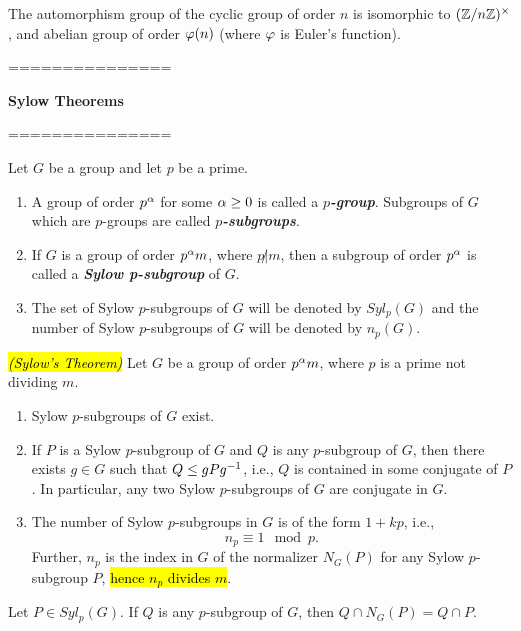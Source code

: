 \nl

\begin{prop}
The automorphism group of the cyclic group of order $n$ is isomorphic to $(\mathbb{Z}/n\mathbb{Z})^\times$, and abelian group of order $\varphi(n)$  (where $\varphi$ is Euler's function).
\end{prop}

===============

\textbf{Sylow Theorems}

===============
\nl
\begin{defn}
Let $G$ be a group and let $p$ be a prime.
\begin{enumerate}
\item A group of order $p^\alpha$ for some $\alpha\geq 0$ is called a $p$\textbf{\textit{-group}}. Subgroups of $G$ which are $p$-groups are called $p$\textbf{\textit{-subgroups}}.
\item If $G$ is a group of order $p^\alpha m$, where $p\not |m$, then a subgroup of order $p^\alpha$ is called a \textbf{\textit{Sylow p-subgroup}} of $G$.
\item The set of Sylow $p$-subgroups of $G$ will be denoted by $Syl_p(G)$ and the number of Sylow $p$-subgroups of $G$ will be denoted by $n_p(G)$.
\end{enumerate}
\end{defn}

\nl

\begin{thm}\hl{\textit{(Sylow's Theorem)}}
Let $G$ be a group of order $p^\alpha m$, where $p$ is a prime not dividing $m$.
\begin{enumerate}
\item Sylow $p$-subgroups of $G$ exist.
\item If $P$ is a Sylow $p$-subgroup of $G$ and $Q$ is any $p$-subgroup of $G$, then there exists $g\in G$ such that $Q\leq gPg^{-1}$, i.e., $Q$ is contained in some conjugate of $P$. In particular, any two Sylow $p$-subgroups of $G$ are conjugate in $G$.
\item The number of Sylow $p$-subgroups in $G$ is of the form $1+kp$, i.e., 
\[n_p\equiv 1\mod p.\]
Further, $n_p$ is the index in $G$ of the normalizer $N_G(P)$ for any Sylow $p$-subgroup $P$, \hl{hence $n_p$ divides $m$}.
\end{enumerate}
\end{thm}

\nl

\begin{lem}
Let $P\in Syl_p(G)$. If $Q$ is any $p$-subgroup of $G$, then $Q\cap N_G(P)=  Q\cap P$.
\end{lem}

